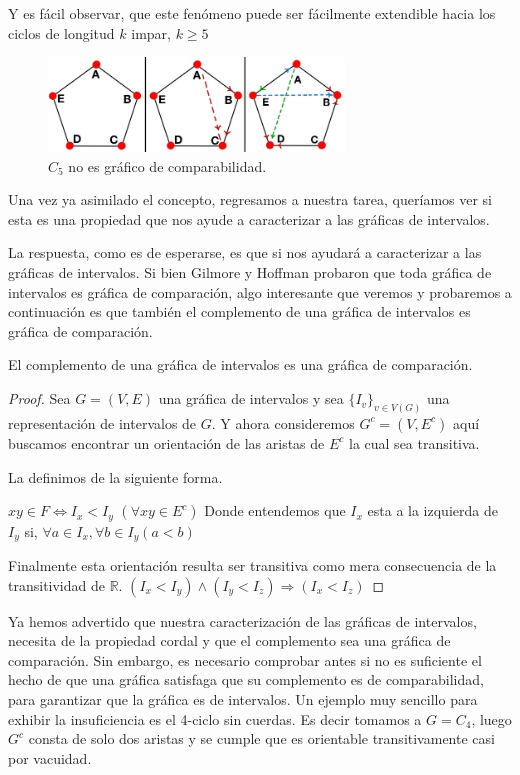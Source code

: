     Y es fácil observar, que este fenómeno puede ser fácilmente extendible hacia los ciclos de longitud $k$ impar, $k\geq 5$

\begin{figure}[H]
  \centering
  \includegraphics[width=0.7\textwidth]{recursos/capturas/207.jpg}
  \caption{$C_5$ no es gráfico de comparabilidad.}
  \label{fig:207}
\end{figure}

Una vez ya asimilado el concepto, regresamos a nuestra tarea, queríamos ver si esta es una propiedad que nos ayude a caracterizar a las gráficas de intervalos. 

La respuesta, como es de esperarse, es que si nos ayudará a caracterizar a las gráficas de intervalos.
Si bien Gilmore y Hoffman probaron que toda gráfica de intervalos es gráfica de comparación, algo interesante que veremos y probaremos a continuación es que también el complemento de una gráfica de intervalos es gráfica de comparación.

\begin{teorema}
    \label{teo:Int-Comprbldd}
    El complemento de una gráfica de intervalos es una gráfica de comparación.
\end{teorema}

\begin{proof}
    Sea $G=(V,E)$ una gráfica de intervalos y sea $\{I_v \}_{v\in V(G)}$ una representación de intervalos de $G$. Y ahora consideremos $G^c =(V, E^c)$ aquí buscamos encontrar un orientación de las aristas de $E^c$ la cual sea transitiva. 
    
    La definimos de la siguiente forma.
    
    $xy\in F \iff I_x<I_y$ $(\forall xy\in E^c)$
    Donde entendemos que $I_x$ esta a la izquierda de $I_y$ si,
    $\forall a\in I_x, \forall b \in I_y(a<b)$

    Finalmente esta orientación resulta ser transitiva como mera consecuencia de la transitividad de $\mathbb{R}$.
    $(I_x < I_y) \wedge (I_y < I_z) \Rightarrow (I_x<I_z) $
\end{proof}

Ya hemos advertido que nuestra caracterización de las gráficas de intervalos, necesita de la propiedad cordal y que el complemento sea una gráfica de comparación. Sin embargo, es necesario comprobar antes si no es suficiente el hecho de que una gráfica satisfaga que su complemento es de comparabilidad, para garantizar que la gráfica es de intervalos. Un ejemplo muy sencillo para exhibir la insuficiencia es el 4-ciclo sin cuerdas. Es decir tomamos a $G=C_4$, luego $G^c$ consta de solo dos aristas y se cumple que es orientable transitivamente casi por vacuidad.

